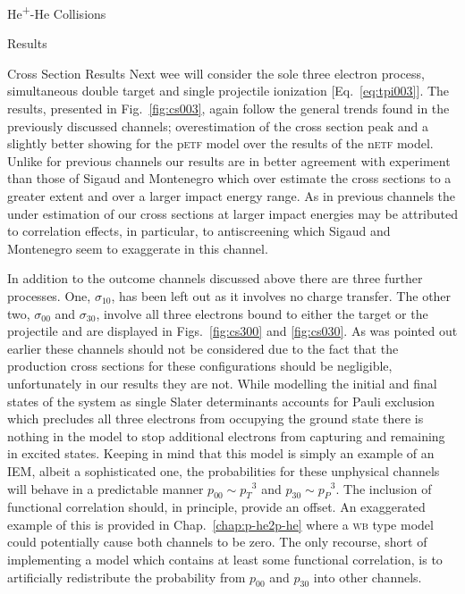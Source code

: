 \documentclass[letterpaper, 11 pt]{report}
\begin{document}
\begin{chapter}{\texorpdfstring{He\textsuperscript{+}}{He+}-He Collisions \label{chap:hephe}}
\begin{section}{Results \label{sec:hephe-disc}}
\begin{subsection}{Cross Section Results \label{sec:hephe-res}}
         Next wee will consider the sole three electron process, simultaneous double target and single
         projectile ionization [Eq.~\eqref{eq:tpi003}]. The results, presented in Fig.~\ref{fig:cs003},
         again follow the general trends found in the previously discussed channels; overestimation of
         the cross section peak and a slightly better showing for the p\textsc{etf} model over the
         results of the n\textsc{etf} model. Unlike for previous channels our results are in better
         agreement with experiment than those of Sigaud and Montenegro which over estimate the cross
         sections to a greater extent and over a larger impact energy range. As in previous channels the
         under estimation of our cross sections at larger impact energies may be attributed to
         correlation effects, in particular, to antiscreening which  Sigaud and Montenegro seem to
         exaggerate in this channel.

         In addition to the outcome channels discussed above there are three further processes. One,
         $\sigma_{10}$, has been left out as it involves no charge transfer. The other two,
         $\sigma_{00}$ and $\sigma_{30}$, involve all three electrons bound to either the target or the
         projectile and are displayed in Figs.~\ref{fig:cs300} and \ref{fig:cs030}. As was pointed out
         earlier these channels should not be considered due to the fact that the production cross
         sections for these configurations should be negligible, unfortunately in our results they are
         not. While modelling the initial and final states of the system as single Slater determinants
         accounts for Pauli exclusion which precludes all three electrons from occupying the ground
         state there is nothing in the model to stop additional electrons from capturing and remaining
         in excited states. Keeping in mind that this model is simply an example of an \textsc{IEM},
         albeit a sophisticated one, the probabilities for these unphysical channels will behave in a
         predictable manner $p_{00} \sim {p_T}^3$ and $p_{30} \sim {p_P}^3$. The inclusion of functional
         correlation should, in principle, provide an offset. An exaggerated example of this is
         provided in Chap.~\ref{chap:p-he2p-he} where a \textsc{wb} type model could potentially cause
         both channels to be zero. The only recourse, short of implementing a model which contains at
         least some functional correlation, is to artificially redistribute the probability from
         $p_{00}$ and $p_{30}$ into other channels.


\end{subsection}
\end{section}
\end{chapter}
\end{document}

